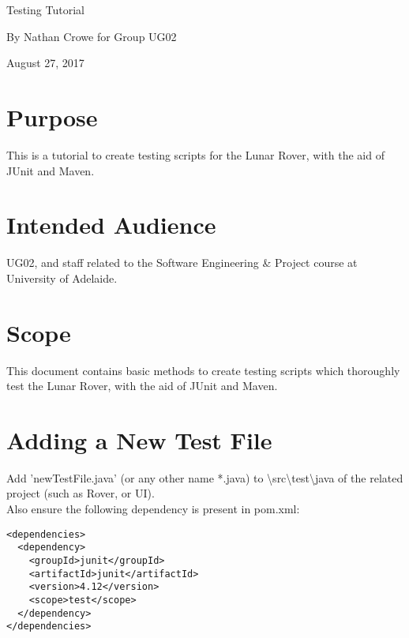 \documentclass[11pt, a4paper]{article}
\begin{document}


\begin{center}    
{\huge Testing Tutorial \par}
\vspace{0.5cm}
{\large By Nathan Crowe for Group UG02 \par}
\vspace{0.5cm}
{\large August 27, 2017 \par}
\vspace{0.5cm}
\end{center}

\section{Purpose}
	This is a tutorial to create testing scripts for the Lunar Rover, with the aid of JUnit and Maven.
\section{Intended Audience}
	UG02, and staff related to the Software Engineering \& Project course at University of Adelaide.
\section{Scope}
	This document contains basic methods to create testing scripts which thoroughly test the Lunar Rover, with the aid of JUnit and Maven.
\section{Adding a New Test File}
	Add 'newTestFile.java' (or any other name *.java) to \textbackslash src\textbackslash test\textbackslash java of the related project (such as Rover, or UI). \\
	Also ensure the following dependency is present in pom.xml:
	\lstset{language=XML}
	\begin{lstlisting}
<dependencies>
  <dependency>
    <groupId>junit</groupId>
    <artifactId>junit</artifactId>
    <version>4.12</version>
    <scope>test</scope>
  </dependency>
</dependencies>
	\end{lstlisting}
	
\end{document}
